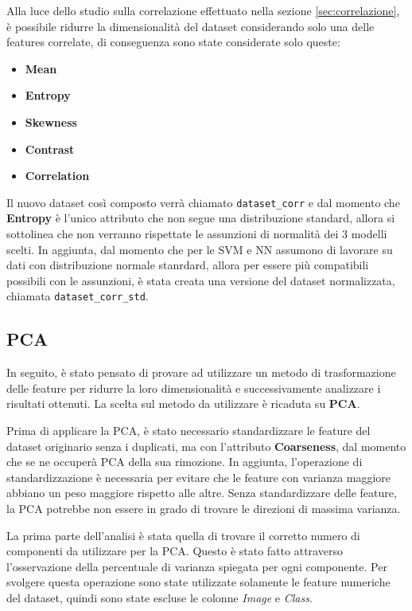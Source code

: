 Alla luce dello studio sulla correlazione effettuato nella sezione \ref{sec:correlazione},
è possibile ridurre la dimensionalità del dataset considerando solo una delle
features correlate, di conseguenza sono state considerate solo queste:
\begin{itemize}
      \item \textbf{Mean}
      \item \textbf{Entropy}
      \item \textbf{Skewness}
      \item \textbf{Contrast}
      \item \textbf{Correlation}
\end{itemize}
Il nuovo dataset così composto verrà chiamato \texttt{dataset\_corr} e dal momento
che \textbf{Entropy} è l'unico attributo che non segue una distribuzione standard,
allora si sottolinea che non verranno rispettate le assunzioni di normalità dei
$3$ modelli scelti. In aggiunta, dal momento che per le SVM e NN assumono di
lavorare su dati con distribuzione normale stanrdard, allora per essere più
compatibili possibili con le assunzioni, è stata creata una versione del dataset
normalizzata, chiamata \texttt{dataset\_corr\_std}.
\subsection{PCA} \label{sec:pca}
In seguito, è stato pensato di provare ad utilizzare un metodo di trasformazione
delle feature per ridurre la loro dimensionalità e successivamente analizzare i
risultati ottenuti. La scelta sul metodo da utilizzare è ricaduta su \textbf{PCA}.

Prima di applicare la PCA, è stato necessario standardizzare le feature del dataset
originario senza i duplicati, ma con l'attributo \textbf{Coarseness}, dal momento
che se ne occuperà PCA della sua rimozione. In aggiunta, l'operazione di
standardizzazione è necessaria per evitare che le feature con varianza maggiore
abbiano un peso maggiore rispetto alle altre. Senza standardizzare delle feature,
la PCA potrebbe non essere in grado di trovare le direzioni di massima varianza.

La prima parte dell'analisi è stata quella di trovare il corretto numero di
componenti da utilizzare per la PCA. Questo è stato fatto attraverso
l'osservazione della percentuale di varianza spiegata per ogni componente. Per
svolgere questa operazione sono state utilizzate solamente le feature numeriche
del dataset, quindi sono state escluse le colonne \textit{Image} e \textit{Class}.

